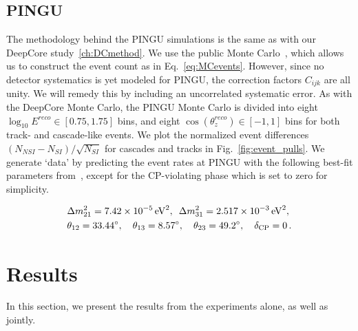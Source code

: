\documentclass[draft=True]{revtex4-2}
\newcommand{\zreco}{\ensuremath{\cos{(\theta_z^{reco})}}}
\newcommand{\dm}{\Delta m^2_{31}}
\begin{document}
\subsection{PINGU}\label{ch:PINGUmethod}
The methodology behind the PINGU simulations is the same as with our DeepCore study~\ref{ch:DCmethod}. We use the public Monte Carlo~\cite{PINGUdata}, 
which allows us to construct the event count as in Eq.~\ref{eq:MCevents}.
However, since no detector systematics is yet modeled for PINGU, the correction factors $C_{ijk}$ are all unity. We will remedy this by including an uncorrelated systematic error.
As with the DeepCore Monte Carlo, the PINGU Monte Carlo is divided into eight 
$\log_{10}E^{reco} \in [0.75,1.75]$ bins, and eight $\zreco \in [-1,1]$ bins for both track- and cascade-like events. 
We plot the normalized event differences $(N_{NSI} - N_{SI})/\sqrt{N_{SI}}$ for cascades and tracks in Fig.~\ref{fig:event_pulls}. %
We generate `data' by predicting the event rates at PINGU with the following best-fit parameters from~\cite{nufit}, except for the CP-violating phase which is set to zero for simplicity.

\begin{align}\label{eq:PINGUparams}
    &\Delta m^2_{21} =  \SI{7.42e-5}{\electronvolt^2},\hspace{0.5em} \dm =  \SI{2.517e-3}{\electronvolt^2}, \nonumber \\
    &\theta_{12} = \SI{33.44}{\degree},\hspace{1em} \theta_{13} = \SI{8.57}{\degree},\hspace{1em} \theta_{23} = \SI{49.2}{\degree}, \hspace{1em} \delta_\text{CP} = 0\,.
\end{align}


\section{Results}
In this section, we present the results from the experiments alone, as well as jointly. 
\end{document}
